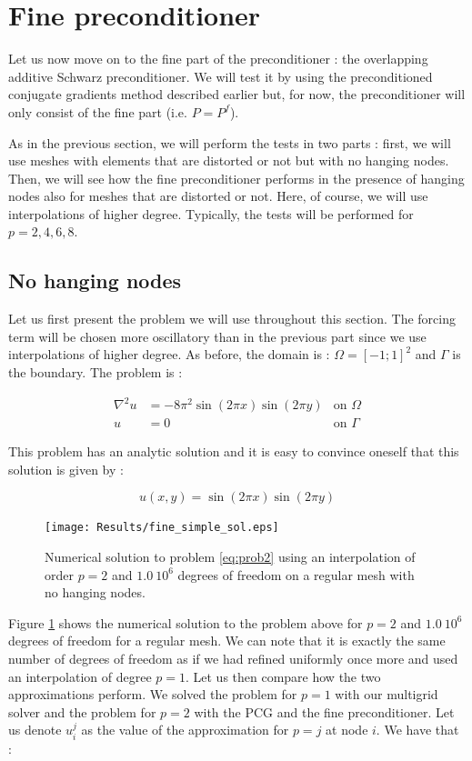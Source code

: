 \section{Fine preconditioner}
Let us now move on to the fine part of the preconditioner : the overlapping additive Schwarz preconditioner. We will test it by using the preconditioned conjugate gradients method described earlier but, for now, the preconditioner will only consist of the fine part (i.e. $P = P^f$).

As in the previous section, we will perform the tests in two parts : first, we will use meshes with elements that are distorted or not but with no hanging nodes. Then, we will see how the fine preconditioner performs in the presence of hanging nodes also for meshes that are distorted or not. Here, of course, we will use interpolations of higher degree. Typically, the tests will be performed for $p=2,4,6,8$.

\subsection{No hanging nodes}

Let us first present the problem we will use throughout this section. The forcing term will be chosen more oscillatory than in the previous part since we use interpolations of higher degree. As before, the domain is : $\Omega = [-1;1]^2$ and $\Gamma$ is the boundary. The problem is : 

\begin{align}
\nabla^2 u &= -8\pi^2\sin(2\pi x)\sin(2\pi y) &\text{on $\Omega$} \label{eq:prob2}\\
u &= 0  &\text{on $\Gamma$}
\end{align}

This problem has an analytic solution and it is easy to convince oneself that this solution is given by : 

$$ u(x,y) = \sin(2\pi x)\sin(2\pi y)$$

\begin{figure}
\centering
\texttt{[image: Results/fine\_simple\_sol.eps]}
\caption{Numerical solution to problem \ref{eq:prob2} using an interpolation of order $p=2$ and $1.0\:10^6$ degrees of freedom on a regular mesh with no hanging nodes.}
\label{fine_simple_sol}
\end{figure}

Figure \ref{fine_simple_sol} shows the numerical solution to the problem above for $p=2$ and $1.0\:10^6$ degrees of freedom for a regular mesh. We can note that it is exactly the same number of degrees of freedom as if we had refined uniformly once more and used an interpolation of degree $p=1$. Let us then compare how the two approximations perform. We solved the problem for $p=1$ with our multigrid solver and the problem for $p=2$ with the PCG and the fine preconditioner. Let us denote $u^j_i$ as the value of the approximation for $p=j$ at node $i$. We have that : 

